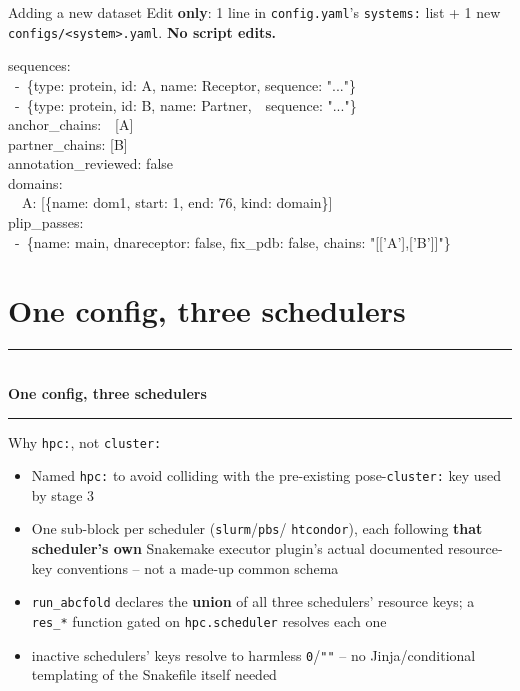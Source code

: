 \documentclass[aspectratio=169]{beamer}
\newcommand{\currentsubsectionname}{}
\newcommand{\sectiondivider}[1]{%
  {\setbeamertemplate{frametitle}{}%
  \begin{frame}
    \vfill
    \begin{center}
      {\color{accent}\rule{0.35\textwidth}{0.6pt}}\\[1.1em]
      {\color{fgtext}\Huge\bfseries #1}\\[1.1em]
      {\color{accent}\rule{0.35\textwidth}{0.6pt}}
    \end{center}
    \vfill
  \end{frame}}%
}
\begin{document}
\begin{frame}{Adding a new dataset}
  \small Edit \textbf{only}: 1 line in \texttt{config.yaml}'s
  \texttt{systems:} list + 1 new \texttt{configs/<system>.yaml}.
  \textcolor{substrate}{\textbf{No script edits.}}

  \vspace{0.6em}
  {\ttfamily\scriptsize
  \begin{flushleft}
  sequences:\\
  \ -\ \{type: protein, id: A, name: Receptor, sequence: "..."\}\\
  \ -\ \{type: protein, id: B, name: Partner,\ \ sequence: "..."\}\\
  anchor\_chains:\ \ [A]\\
  partner\_chains: [B]\\
  annotation\_reviewed: false\\
  domains:\\
  \ \ A: [\{name: dom1, start: 1, end: 76, kind: domain\}]\\
  plip\_passes:\\
  \ -\ \{name: main, dnareceptor: false, fix\_pdb: false, chains: "[['A'],['B']]"\}\\
  \end{flushleft}
  }
\end{frame}

\section{One config, three schedulers}
\gdef\currentsubsectionname{}
\sectiondivider{One config, three schedulers}

\begin{frame}{Why \texttt{hpc:}, not \texttt{cluster:}}
  \begin{itemize}
    \item Named \texttt{hpc:} to avoid colliding with the pre-existing
      pose-\texttt{cluster:} key used by stage 3
    \item One sub-block per scheduler (\texttt{slurm}/\texttt{pbs}/
      \texttt{htcondor}), each following \textbf{that scheduler's own}
      Snakemake executor plugin's actual documented resource-key
      conventions -- not a made-up common schema
    \item \texttt{run\_abcfold} declares the \textbf{union} of all three
      schedulers' resource keys; a \texttt{res\_*} function gated on
      \texttt{hpc.scheduler} resolves each one
    \item[$\Rightarrow$] inactive schedulers' keys resolve to harmless
      \texttt{0}/\texttt{""} -- no Jinja/conditional templating of the
      Snakefile itself needed
  \end{itemize}
\end{frame}
\end{document}
